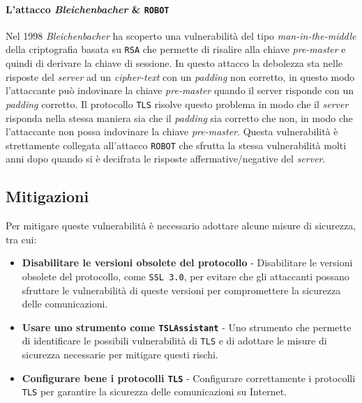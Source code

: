         \paragraph{L'attacco \textit{Bleichenbacher} \& \texttt{ROBOT}} Nel 1998 \textit{Bleichenbacher} ha scoperto una vulnerabilità del tipo \textit{man-in-the-middle} della criptografia basata su \texttt{RSA} che permette di risalire alla chiave \textit{pre-master} e quindi di derivare la chiave di sessione. In questo attacco la debolezza sta nelle risposte del \textit{server} ad un \textit{cipher-text} con un \textit{padding} non corretto, in questo modo l'attaccante può indovinare la chiave \textit{pre-master} quando il server risponde con un \textit{padding} corretto. Il protocollo \texttt{TLS} risolve questo problema in modo che il \textit{server} risponda nella stessa maniera sia che il \textit{padding} sia corretto che non, in modo che l'attaccante non possa indovinare la chiave \textit{pre-master}. Questa vulnerabilità è strettamente collegata all'attacco \texttt{ROBOT} che sfrutta la stessa vulnerabilità molti anni dopo quando si è decifrata le risposte affermative/negative del \textit{server}.
    \subsection{Mitigazioni}
        Per mitigare queste vulnerabilità è necessario adottare alcune misure di sicurezza, tra cui: \begin{itemize}
            \item \textbf{Disabilitare le versioni obsolete del protocollo} - Disabilitare le versioni obsolete del protocollo, come \texttt{SSL 3.0}, per evitare che gli attaccanti possano sfruttare le vulnerabilità di queste versioni per compromettere la sicurezza delle comunicazioni.
            \item \textbf{Usare uno strumento come \texttt{TSLAssistant}} - Uno strumento che permette di identificare le possibili vulnerabilità di \texttt{TLS} e di adottare le misure di sicurezza necessarie per mitigare questi rischi.
            \item \textbf{Configurare bene i protocolli \texttt{TLS}} - Configurare correttamente i protocolli \texttt{TLS} per garantire la sicurezza delle comunicazioni su Internet.
        \end{itemize}